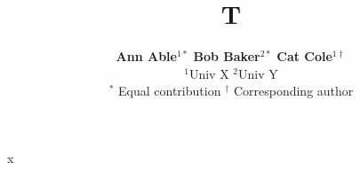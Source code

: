 \documentclass{article}
\begin{document}
\title{T}
\author{\textbf{Ann Able}$^{1\ast}$ \: \textbf{Bob Baker}$^{2\ast}$ \: \textbf{Cat Cole}$^{1\dagger}$ \\
  $^1$Univ X \quad $^2$Univ Y

  $^{\ast}$ Equal contribution \: ${^\dagger}$ Corresponding author}
\maketitle
x
\end{document}
